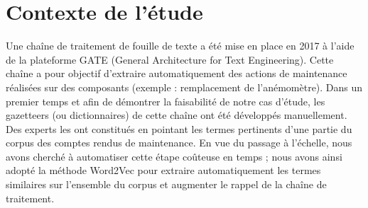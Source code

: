 \section{Contexte de l'étude}
Une chaîne de traitement de fouille de texte a été mise en place en 2017 à l’aide de la plateforme GATE (General Architecture for Text Engineering). Cette chaîne a pour objectif d’extraire automatiquement des actions de maintenance réalisées sur des composants (exemple : remplacement de l’anémomètre). Dans un premier temps et afin de démontrer la faisabilité de notre cas d’étude, les gazetteers (ou dictionnaires) de cette chaîne ont été développés manuellement. Des experts les ont constitués en pointant les termes pertinents d’une partie du corpus des comptes rendus de maintenance. En vue du passage à l’échelle, nous avons cherché à automatiser cette étape coûteuse en temps ; nous avons ainsi adopté la méthode Word2Vec pour extraire automatiquement les termes similaires sur l’ensemble du corpus et augmenter le rappel de la chaîne de traitement.
